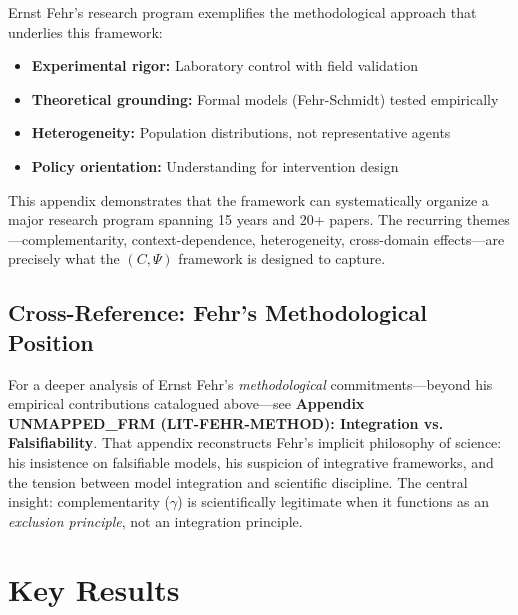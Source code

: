 Ernst Fehr's research program exemplifies the methodological approach
that underlies this framework:
\begin{itemize}
  \item \textbf{Experimental rigor:} Laboratory control with field validation
  \item \textbf{Theoretical grounding:} Formal models (Fehr-Schmidt) tested empirically
  \item \textbf{Heterogeneity:} Population distributions, not representative agents
  \item \textbf{Policy orientation:} Understanding for intervention design
\end{itemize}

This appendix demonstrates that the framework can systematically organize
a major research program spanning 15 years and 20+ papers. The recurring
themes---complementarity, context-dependence, heterogeneity, cross-domain
effects---are precisely what the $(C, \Psi)$ framework is designed to capture.

\subsection{Cross-Reference: Fehr's Methodological Position}

For a deeper analysis of Ernst Fehr's \textit{methodological} commitments---beyond
his empirical contributions catalogued above---see \textbf{Appendix UNMAPPED_FRM (LIT-FEHR-METHOD):
Integration vs. Falsifiability}. That appendix reconstructs Fehr's implicit philosophy
of science: his insistence on falsifiable models, his suspicion of integrative frameworks,
and the tension between model integration and scientific discipline. The central insight:
complementarity ($\gamma$) is scientifically legitimate when it functions as an
\textit{exclusion principle}, not an integration principle.




\section{Key Results}
\label{sec:feh-results}

